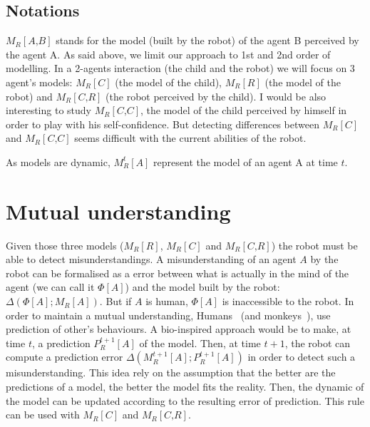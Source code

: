 \documentclass[conference]{IEEEtran}
\begin{document}
\subsection{Notations}
$M_R\left[\textit{A,B}\right]$ stands for the model (built by the robot) of the agent B perceived by the agent A. As said above, we limit our approach to 1st and 2nd order of modelling. In a 2-agents interaction (the child and the robot) we will focus on 3 agent's models: $ M_R\left[\textit{C}\right]$ (the model of the child), $ M_R\left[\textit{R}\right]$ (the model of the robot) and $ M_R\left[\textit{C,R}\right]$ (the robot perceived by the child). I would be also interesting to study $ M_R\left[\textit{C,C}\right]$, the model of the child perceived by himself in order to play with his self-confidence. But detecting differences between $ M_R\left[\textit{C}\right]$ and $ M_R\left[\textit{C,C}\right]$ seems difficult with the current abilities of the robot. 

As models are dynamic, $ M^t_R\left[\textit{A}\right]$ represent the model of an agent A at time $t$.

\section{Mutual understanding}
Given those three models ($ M_R\left[\textit{R}\right]$, $ M_R\left[\textit{C}\right]$ and $ M_R\left[\textit{C,R}\right]$) the robot must be able to detect misunderstandings. A misunderstanding of an agent $A$ by the robot can be formalised as a error between what is actually in the mind of the agent (we can call it $\Phi[A]$) and the model built by the robot: $\Delta \left(\Phi[A] ; M_R\left[\textit{A}\right]\right)$. But if $A$ is human, $\Phi[A]$ is inaccessible to the robot. In order to maintain a mutual understanding, Humans~\cite{suzuki2015neural} (and monkeys~\cite{haroush2015neuronal}), use prediction of other's behaviours. A bio-inspired approach would be to make, at time $t$, a prediction $P^{t+1}_R\left[\textit{A}\right]$ of the model. Then, at time $t+1$, the robot can compute a prediction error $\Delta \left( M^{t+1}_R\left[\textit{A}\right]; P^{t+1}_R\left[\textit{A}\right]\right)$ in order to detect such a misunderstanding. This idea rely on the assumption that the better are the predictions of a model, the better the model fits the reality. Then, the dynamic of the model can be updated according to the resulting error of prediction. This rule can be used with $ M_R\left[\textit{C}\right]$ and $ M_R\left[\textit{C,R}\right]$. 
\end{document}
